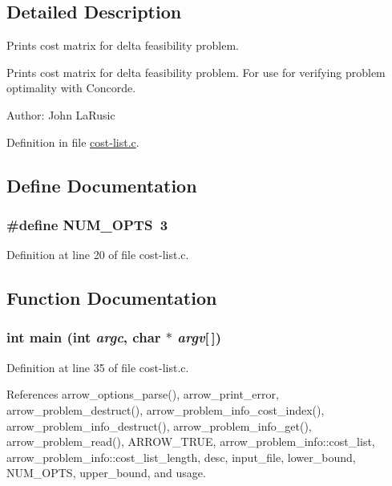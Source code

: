 \subsection{Detailed Description}
Prints cost matrix for delta feasibility problem. 

Prints cost matrix for delta feasibility problem. For use for verifying problem optimality with Concorde.

\begin{Desc}
\item[Author:]John LaRusic \end{Desc}


Definition in file \hyperlink{cost-list_8c-source}{cost-list.c}.

\subsection{Define Documentation}
\hypertarget{cost-list_8c_9b58b2c4af931c8486a986c9deca40f5}{
\subsubsection[{NUM\_\-OPTS}]{\setlength{\rightskip}{0pt plus 5cm}\#define NUM\_\-OPTS~3}}
\label{cost-list_8c_9b58b2c4af931c8486a986c9deca40f5}




Definition at line 20 of file cost-list.c.

\subsection{Function Documentation}
\hypertarget{cost-list_8c_0ddf1224851353fc92bfbff6f499fa97}{
\subsubsection[{main}]{\setlength{\rightskip}{0pt plus 5cm}int main (int {\em argc}, \/  char $\ast$ {\em argv}\mbox{[}$\,$\mbox{]})}}
\label{cost-list_8c_0ddf1224851353fc92bfbff6f499fa97}




Definition at line 35 of file cost-list.c.

References arrow\_\-options\_\-parse(), arrow\_\-print\_\-error, arrow\_\-problem\_\-destruct(), arrow\_\-problem\_\-info\_\-cost\_\-index(), arrow\_\-problem\_\-info\_\-destruct(), arrow\_\-problem\_\-info\_\-get(), arrow\_\-problem\_\-read(), ARROW\_\-TRUE, arrow\_\-problem\_\-info::cost\_\-list, arrow\_\-problem\_\-info::cost\_\-list\_\-length, desc, input\_\-file, lower\_\-bound, NUM\_\-OPTS, upper\_\-bound, and usage.

